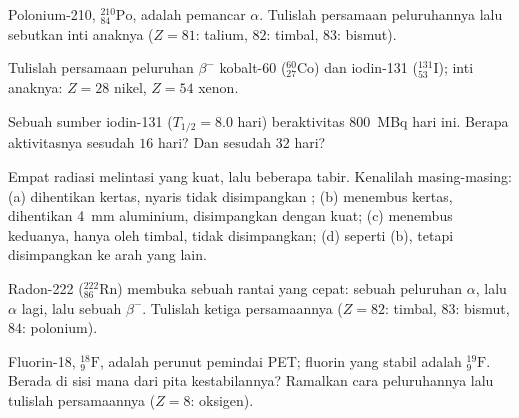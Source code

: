\begin{exercise}[$\star$]\label{exo:g11:nucleus-radioactivity:3}
Polonium-210, ${}^{210}_{84}\mathrm{Po}$, adalah pemancar $\alpha$. Tulislah
persamaan peluruhannya lalu sebutkan inti anaknya ($Z = 81$: talium, $82$:
timbal, $83$: bismut).
\end{exercise}

\begin{exercise}[$\star$]\label{exo:g11:nucleus-radioactivity:4}
Tulislah persamaan peluruhan $\beta^-$ kobalt-60
(${}^{60}_{27}\mathrm{Co}$) dan iodin-131 (${}^{131}_{53}\mathrm{I}$); inti
anaknya: $Z = 28$ nikel, $Z = 54$ xenon.
\end{exercise}

\begin{exercise}[$\star$]\label{exo:g11:nucleus-radioactivity:5}
Sebuah sumber iodin-131 ($T_{1/2} = 8.0$ hari) beraktivitas \qty{800}{MBq}
hari ini. Berapa aktivitasnya sesudah $16$ hari? Dan sesudah $32$ hari?
\end{exercise}

\begin{exercise}[$\star\star$]\label{exo:g11:nucleus-radioactivity:6}
Empat radiasi melintasi  yang kuat, lalu beberapa tabir.
Kenalilah masing-masing: (a) dihentikan kertas, nyaris tidak disimpangkan
; (b) menembus kertas, dihentikan \qty{4}{mm} aluminium,
disimpangkan dengan kuat; (c) menembus keduanya, hanya  oleh
timbal, tidak disimpangkan; (d) seperti (b), tetapi disimpangkan ke arah
yang lain.
\end{exercise}

\begin{exercise}[$\star\star$]\label{exo:g11:nucleus-radioactivity:7}
Radon-222 (${}^{222}_{86}\mathrm{Rn}$) membuka sebuah rantai yang cepat:
sebuah peluruhan $\alpha$, lalu $\alpha$ lagi, lalu sebuah $\beta^-$.
Tulislah ketiga persamaannya ($Z = 82$: timbal, $83$: bismut, $84$:
polonium).
\end{exercise}

\begin{exercise}[$\star\star$]\label{exo:g11:nucleus-radioactivity:8}
Fluorin-18, ${}^{18}_{9}\mathrm{F}$, adalah perunut pemindai PET; fluorin
yang stabil adalah ${}^{19}_{9}\mathrm{F}$. Berada di sisi mana dari pita
kestabilannya? Ramalkan cara peluruhannya lalu tulislah persamaannya
($Z = 8$: oksigen).
\end{exercise}

